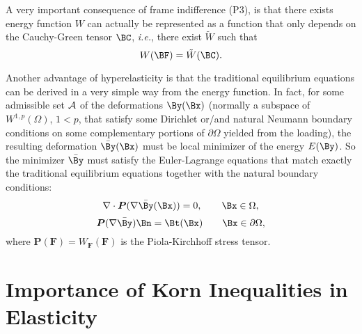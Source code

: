 A very important consequence of frame indifference (P3), is that there exists energy function $W$ can actually be represented as a function that only depends on the Cauchy-Green tensor $\BC$, \textit{i.e.}, there exist $\tilde{W}$ such that
$$W(\BF)=\tilde{W}(\BC).$$ 

Another advantage of hyperelasticity is that the traditional equilibrium equations can be derived in a very simple way from the energy function. In fact, for some admissible set $\cal A$  of the deformations $\By(\Bx)$ (normally a subspace of $W^{1,p}(\Omega)$, $1<p$, that satisfy some Dirichlet or/and natural Neumann boundary conditions on some complementary portions of $\partial\Omega$ yielded from the loading),  the resulting deformation $\bar\By(\Bx)$ must be local minimizer of the energy $E(\By)$. So the minimizer $\bar\By$ must satisfy the Euler-Lagrange equations that match exactly the traditional equilibrium equations together with the natural boundary conditions:
\begin{equation}
    \label{eq:EL1}
    \nabla\cdot \bm P(\nabla \bar\By(\Bx))=0, \qquad \Bx\in \Omega,
\end{equation} 
\begin{equation}
    \label{eq:EL2}
    \bm P(\nabla \bar\By) \Bn=\Bt(\Bx) \qquad \Bx\in\dOm,
\end{equation}
    where $\boldsymbol{P}(\boldsymbol{F})=W_{\boldsymbol{F}}(\boldsymbol{F})$  is the Piola-Kirchhoff stress tensor. 



\section{Importance of Korn Inequalities in Elasticity}
\label{sec:introKorn}\
